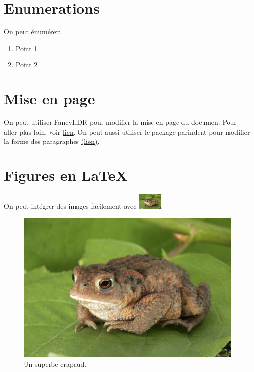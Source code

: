 \section{Enumerations}

On peut énumérer:

\begin{enumerate}
    \item Point 1
    \item Point 2
\end{enumerate}

\section{Mise en page}

On peut utiliser FancyHDR pour modifier la mise en page du documen.
Pour aller plus loin, voir \href{https://fr.overleaf.com/learn/latex/Headers_and_footers#Using_the_fancyhdr_package}{lien}.
On peut aussi utiliser le package parindent pour modifier la forme des paragraphes \href{https://www.overleaf.com/learn/latex/Articles/How_to_change_paragraph_spacing_in_LaTeX#The_parskip_package}{(lien)}.

\section{Figures en \LaTeX}

On peut intégrer des images facilement avec \includegraphics[width=12mm]{figures/toad.jpg}.

\blindtext[2]

\begin{figure}[htbp]
    \begin{center}
        \includegraphics[width=1.\textwidth]{figures/toad.jpg}
    \end{center}
    \caption{Un superbe crapaud.}
    \label{fig:toad}
\end{figure}

